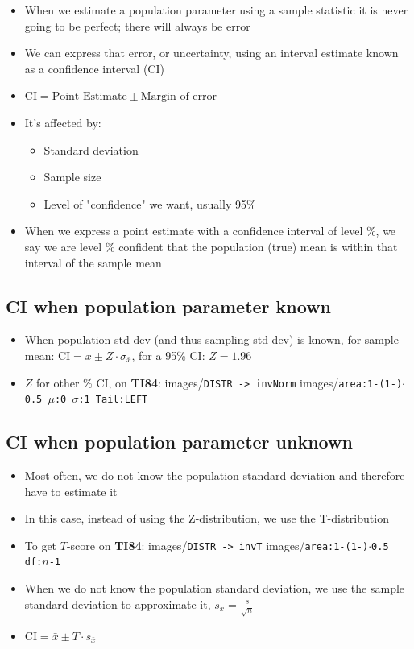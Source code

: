\documentclass{article}
\newcommand{\code}[1]{images/\colorbox{light-gray}{\texttt{#1}}}
\begin{document}
\begin{itemize}
    \item When we estimate a population parameter using a sample statistic it is never going to be perfect; there will always be error
    \item We can express that error, or uncertainty, using an interval estimate known as a confidence interval (CI)
    \item $\text{CI} = \text{Point Estimate} \pm \text{Margin of error}$
    \item It's affected by:
    \begin{itemize}
        \item Standard deviation
        \item Sample size
        \item Level of "confidence" we want, usually 95\%
    \end{itemize}
    \item When we express a point estimate with a confidence interval of level \%, we say we are level \% confident that the population (true) mean is within that interval of the sample mean
\end{itemize}

\subsection{CI when population parameter known}

\begin{itemize}
    \item When population std dev (and thus sampling std dev) is known, for sample mean: $\text{CI}=\bar{x} \pm Z \cdot \sigma_{\bar{x}}$, for a 95\% CI: $Z=1.96$
    \item $Z$ for other \% CI, on \textbf{TI84}: \code{DISTR -> invNorm} \code{area:1-(1-\text{\%})$\cdot$0.5 $\mu$:0 $\sigma$:1 Tail:LEFT}
\end{itemize}

\subsection{CI when population parameter unknown}

\begin{itemize}
    \item Most often, we do not know the population standard deviation and therefore have to estimate it
    \item In this case, instead of using the Z-distribution, we use the T-distribution
    \item To get $T$-score on \textbf{TI84}: \code{DISTR -> invT} \code{area:1-(1-\text{\%})$\cdot$0.5 df:$n$-1}
    \item When we do not know the population standard deviation, we use the sample standard deviation to approximate it, $s_{\bar{x}}=\frac{s}{\sqrt{n}}$
    \item $\text{CI} = \bar{x} \pm T \cdot s_{\bar{x}}$
\end{itemize}
\end{document}
